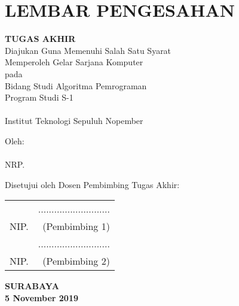 \chapter{LEMBAR PENGESAHAN}
\small

\begin{center}
	\textbf{\MakeUppercase\judul}
	\vspace*{0.3em}
	
	\textbf{TUGAS AKHIR} \\
	Diajukan Guna Memenuhi Salah Satu Syarat\\
	Memperoleh Gelar Sarjana Komputer\\
	pada\\
	Bidang Studi Algoritma Pemrograman\\
	Program Studi S-1 \jurusan\\
	\fakultas \\
	Institut Teknologi Sepuluh Nopember
	
	\vspace*{0.3em}
	
	Oleh:\\
	\textbf{\penulis} \\
	NRP. \nrp
	
	\vspace*{1.1em}
\end{center}

Disetujui oleh Dosen Pembimbing Tugas Akhir: \\
\vspace*{1.3em}

\begin{tabularx}{\linewidth}{ @{}l r }
	\pembimbingsatu & ........................... \vspace*{1.4em} \\
	NIP. \nikpembimbingsatu & (Pembimbing 1) \vspace*{2.6em} \\
	
	\pembimbingdua & ........................... \vspace*{1.4em} \\
	NIP. \nikpembimbingdua & (Pembimbing 2) \vspace*{0.9em}
\end{tabularx}

\begin{center}
	\textbf {SURABAYA} \\
	\textbf {5 November 2019}
\end{center}

\normalsize
\cleardoublepage